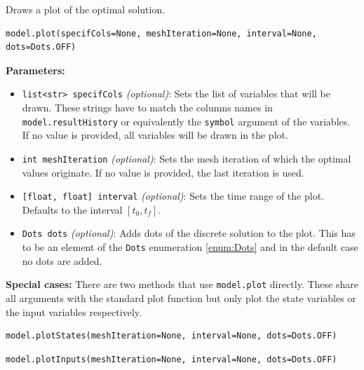 \documentclass[12pt]{article}
\begin{document}
\begin{mdframed}[backgroundcolor=gray!10, roundcorner=10pt,
		linewidth=1pt]

	Draws a plot of the optimal solution.

	\begin{lstlisting}
model.plot(specifCols=None, meshIteration=None, interval=None, dots=Dots.OFF) 
		\end{lstlisting}
	\label{plot}
	\textbf{Parameters:}
	\begin{itemize}
		\item \texttt{list<str> specifCols} \emph{(optional)}: Sets the
		      list of variables that will be drawn. These strings have to match the columns
		      names in \texttt{model.resultHistory} or equivalently the \texttt{symbol}
		      argument of the variables. If no value is provided, all variables will be drawn
		      in the plot.

		\item \texttt{int meshIteration} \emph{(optional)}: Sets the
		      mesh iteration of which the optimal values originate. If no value is provided,
		      the last iteration is used.

		\item \texttt{[float, float] interval} \emph{(optional)}: Sets
		      the time range of the plot. Defaults to the interval $[t_0, t_f]$.

		\item \texttt{Dots dots} \emph{(optional)}: Adds dots of the
		      discrete solution to the plot. This has to be an element of the \texttt{Dots}
		      enumeration \eqref{enum:Dots} and in the default case no dots are added.
	\end{itemize}

	\textbf{Special cases:}
	There are two methods that use \texttt{model.plot} directly.
	These share all arguments with the standard plot function but only plot the
	state variables or the input variables respectively.
	\begin{lstlisting}
model.plotStates(meshIteration=None, interval=None, dots=Dots.OFF)     
		\end{lstlisting}

	\begin{lstlisting}
model.plotInputs(meshIteration=None, interval=None, dots=Dots.OFF)     
		\end{lstlisting}


\end{mdframed}
\end{document}
